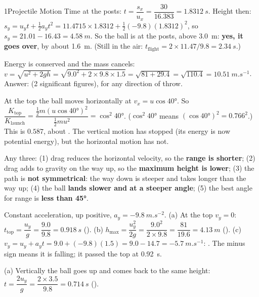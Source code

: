 \begin{chapteranswers}{1}{Projectile Motion}
        Time at the posts: $t = \dfrac{s_x}{u_x} = \dfrac{30}{16.383} = \qty{1.8312}{s}$.
        Height then: $s_y = u_y t + \frac{1}{2}a_y t^2 = 11.4715 \times 1.8312 + \frac{1}{2}(-9.8)(1.8312)^2$,
        so $s_y = 21.01 - 16.43 = \qty{4.58}{m}$.
        So the ball is  at the posts, above \qty{3.0}{m}:
        \textbf{yes, it goes over}, by about \qty{1.6}{m}. (Still in the air:
        $t_\mathrm{flight} = 2 \times 11.47/9.8 = \qty{2.34}{s}$.)
  \item Energy is conserved and the mass cancels:
        $v = \sqrt{u^2 + 2gh} = \sqrt{9.0^2 + 2 \times 9.8 \times 1.5} = \sqrt{81 + 29.4}
        = \sqrt{110.4} = \qty{10.51}{m.s^{-1}}$.
        Answer:  (2 significant figures), for any direction of throw.
  \item At the top the ball moves horizontally at $v_x = u\cos\ang{40}$. So
        $\dfrac{K_\mathrm{top}}{K_\mathrm{launch}} = \dfrac{\frac{1}{2}m(u\cos\ang{40})^2}{\frac{1}{2}mu^2}
        = \cos^2\ang{40}$. ($\cos^2\ang{40}$ means $(\cos\ang{40})^2 = 0.766^2$.) This is
        $0.587$, about .
        The vertical motion has stopped (its energy is now potential energy), but the horizontal
        motion has not.
  \item Any three: (1) drag reduces the horizontal velocity, so the \textbf{range is shorter};
        (2) drag adds to gravity on the way up, so the \textbf{maximum height is lower}; (3) the
        path is \textbf{not symmetrical}: the way down is steeper and takes longer than the way
        up; (4) the ball \textbf{lands slower and at a steeper angle}; (5) the best angle for
        range is \textbf{less than \ang{45}}.
  \item Constant acceleration, up positive, $a_y = \qty{-9.8}{m.s^{-2}}$.
        (a) At the top $v_y = 0$: $t_\mathrm{top} = \dfrac{u_y}{g} = \dfrac{9.0}{9.8} = \qty{0.918}{s}$
        ().
        (b) $h_\mathrm{max} = \dfrac{u_y^2}{2g} = \dfrac{9.0^2}{2 \times 9.8} = \dfrac{81}{19.6}
        = \qty{4.13}{m}$ ().
        (c) $v_y = u_y + a_y t = 9.0 + (-9.8)(1.5) = 9.0 - 14.7 = \qty{-5.7}{m.s^{-1}}$:
        . The minus sign means it is falling; it passed the
        top at \qty{0.92}{s}.
  \item (a) Vertically the ball goes up and comes back to the same height:
        $t = \dfrac{2u_y}{g} = \dfrac{2 \times 3.5}{9.8} = \qty{0.714}{s}$ ().

\end{chapteranswers}
